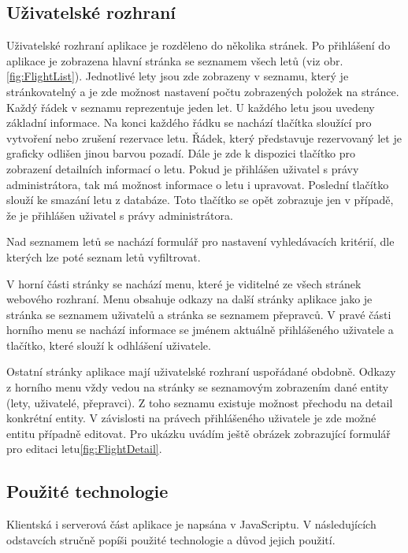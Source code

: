 \documentclass[ing,male,java,dept460,twoside]{diploma}						%
\begin{document}
\subsection{Uživatelské rozhraní}
Uživatelské rozhraní aplikace je rozděleno do několika stránek. Po přihlášení do aplikace je zobrazena hlavní stránka se seznamem všech letů (viz obr. \ref{fig:FlightList}). Jednotlivé lety jsou zde zobrazeny v seznamu, který je stránkovatelný a je zde možnost nastavení počtu zobrazených položek na stránce. Každý řádek v seznamu reprezentuje jeden let. U každého letu jsou uvedeny základní informace. Na konci každého řádku se nachází tlačítka sloužící pro vytvoření nebo zrušení rezervace letu. Řádek, který představuje rezervovaný let je graficky odlišen jinou barvou pozadí. Dále je zde k dispozici tlačítko pro zobrazení detailních informací o letu. Pokud je přihlášen uživatel s právy administrátora, tak má možnost informace o letu i upravovat. Poslední tlačítko slouží ke smazání letu z databáze. Toto tlačítko se opět zobrazuje jen v případě, že je přihlášen uživatel s právy administrátora.


Nad seznamem letů se nachází formulář pro nastavení vyhledávacích kritérií, dle kterých lze poté seznam letů vyfiltrovat.

V horní části stránky se nachází menu, které je viditelné ze všech stránek webového rozhraní. Menu obsahuje odkazy na další stránky aplikace jako je stránka se seznamem uživatelů a stránka se seznamem přepravců. V pravé části horního menu se nachází informace se jménem aktuálně přihlášeného uživatele a tlačítko, které slouží k odhlášení uživatele.

Ostatní stránky aplikace mají uživatelské rozhraní uspořádané obdobně. Odkazy z horního menu vždy vedou na stránky se seznamovým zobrazením dané entity (lety, uživatelé, přepravci). Z toho seznamu existuje možnost přechodu na detail konkrétní entity. V závislosti na právech přihlášeného uživatele je zde možné entitu případně editovat. Pro ukázku uvádím ještě obrázek zobrazující formulář pro editaci letu\ref{fig:FlightDetail}.


\subsection{Použité technologie}
\label{sec:Pouzite_technologie}
Klientská i serverová část aplikace je napsána v JavaScriptu. V následujících odstavcích stručně popíši použité technologie a důvod jejich použití.
\end{document}
